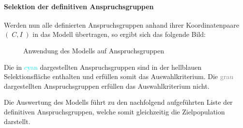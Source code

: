 \documentclass[../../main.tex]{subfiles}
\begin{document}
\paragraph*{Selektion der definitiven Anspruchsgruppen}\mbox{}

\begin{sloppypar}
Werden nun alle definierten Anspruchsgruppen anhand ihrer Koordinatenpaare $(\;C,I\;)$ in das Modell übertragen, so ergibt sich das folgende Bild:
\end{sloppypar} 

\begin{figure}[H]
    
    \caption{Anwendung des Modells auf Anspruchsgruppen}
    \label{fig:raster2}
\end{figure}

\begin{sloppypar}
Die in \textcolor{cyan}{cyan} dargestellten Anspruchsgruppen sind in der \textcolor{mylightblue}{hellblauen} Selektionsfläche enthalten und erfüllen somit das Auswahlkriterium. Die \textcolor{gray}{grau} dargestellten Anspruchsgruppen erfüllen das Auswahlkriterium nicht.

Die Auswertung des Modells führt zu den nachfolgend aufgeführten Liste der definitiven Anspruchsgruppen, welche somit gleichzeitig die Zielpopulation darstellt.
\end{sloppypar}

\end{document}
